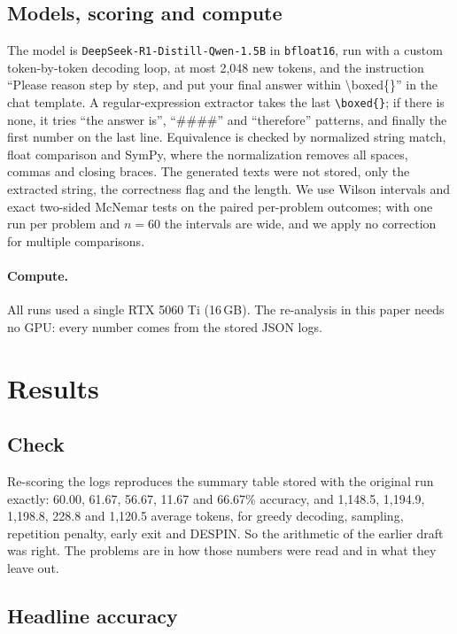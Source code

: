 \documentclass[11pt]{article}
\begin{document}
\subsection{Models, scoring and compute}
The model is \texttt{DeepSeek-R1-Distill-Qwen-1.5B} \citep{deepseek2025r1} in \texttt{bfloat16}, run with a custom token-by-token decoding loop, at most 2{,}048 new tokens, and the instruction ``Please reason step by step, and put your final answer within \textbackslash boxed\{\}'' in the chat template. A regular-expression extractor takes the last \texttt{\textbackslash boxed\{\}}; if there is none, it tries ``the answer is'', ``\#\#\#\#'' and ``therefore'' patterns, and finally the first number on the last line. Equivalence is checked by normalized string match, float comparison and SymPy, where the normalization removes all spaces, commas and closing braces. The generated texts were not stored, only the extracted string, the correctness flag and the length. We use Wilson intervals \citep{wilson1927probable} and exact two-sided McNemar tests \citep{mcnemar1947note} on the paired per-problem outcomes; with one run per problem and $n=60$ the intervals are wide, and we apply no correction for multiple comparisons.

\paragraph{Compute.} All runs used a single RTX 5060 Ti (16\,GB). The re-analysis in this paper needs no GPU: every number comes from the stored JSON logs.

\section{Results}\label{sec:results}

\subsection{Check}
Re-scoring the logs reproduces the summary table stored with the original run exactly: 60.00, 61.67, 56.67, 11.67 and 66.67\% accuracy, and 1{,}148.5, 1{,}194.9, 1{,}198.8, 228.8 and 1{,}120.5 average tokens, for greedy decoding, sampling, repetition penalty, early exit and DESPIN. So the arithmetic of the earlier draft was right. The problems are in how those numbers were read and in what they leave out.

\subsection{Headline accuracy}
\end{document}

